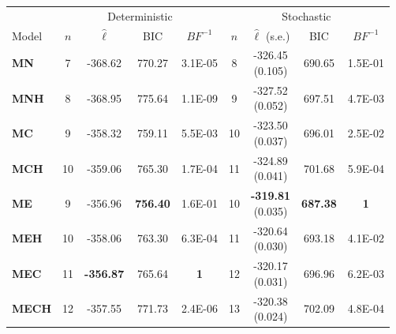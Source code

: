 \begin{table}[h!]
\centering
\small
\begin{tabular}{lcccccccc}
  \toprule
  & \multicolumn{4}{c}{Deterministic} & \multicolumn{4}{c}{Stochastic} \\
    \cmidrule(rl){2-5}\cmidrule(rl){6-9}
  Model & $n$ & $\hat{\ell}$ & BIC & ${BF}^{-1}$ & $n$ & \makecell{$\hat{\ell}$ \vspace{-.3cm} \\ \scriptsize{(s.e.)}}  & BIC  & $BF^{-1}$ \\ 
  \cmidrule(rl){2-5}\cmidrule(rl){6-9}
  \textbf{MN} &   7 & -368.62 & 770.27 & 3.1E-05 &   8 & \makecell{-326.45 \vspace{-.3cm} \\ \scriptsize{(0.105)}} & 690.65 & 1.5E-01 \\ 
   \textbf{MNH} &   8 & -368.95 & 775.64 & 1.1E-09 &   9 & \makecell{-327.52\vspace{-.3cm} \\ \scriptsize{(0.052)}} & 697.51 & 4.7E-03 \\ 
   \textbf{MC} &   9 & -358.32 & 759.11 & 5.5E-03 &  10 & \makecell{-323.50\vspace{-.3cm} \\ \scriptsize{(0.037)}} & 696.01 & 2.5E-02 \\ 
   \textbf{MCH} &  10 & -359.06 & 765.30 & 1.7E-04 &  11 & \makecell{-324.89\vspace{-.3cm} \\ \scriptsize{(0.041)}} & 701.68 & 5.9E-04 \\ 
   \textbf{ME} &   9 & -356.96 & \textbf{756.40} & 1.6E-01 &  10 & \makecell{\textbf{-319.81}\vspace{-.3cm} \\ \scriptsize{(0.035)}} & \textbf{687.38} & \textbf{1} \\ 
   \textbf{MEH} &  10 & -358.06 & 763.30 & 6.3E-04 &  11 & \makecell{-320.64\vspace{-.3cm} \\ \scriptsize{(0.030)}} & 693.18 & 4.1E-02 \\ 
   \textbf{MEC} &  11 & \textbf{-356.87} & 765.64 & \textbf{1} &  12 & \makecell{-320.17\vspace{-.3cm} \\ \scriptsize{(0.031)}} & 696.96 & 6.2E-03 \\ 
   \textbf{MECH} &  12 & -357.55 & 771.73 & 2.4E-06 &  13 & \makecell{-320.38\vspace{-.3cm} \\ \scriptsize{(0.024)}} & 702.09 & 4.8E-04 \\ 

\end{tabular}
\end{table}
